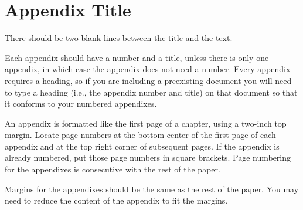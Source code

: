 \documentclass[letterpaper,12pt,oneside,openany]{book}
\begin{document}
\appendix

\chapter{Appendix Title}

There should be two blank lines between the title and the text.

Each appendix should have a number and a title, unless there is only one
appendix, in which case the appendix does not need a number. Every appendix
requires a heading, so if you are including a preexisting document you will
need to type a heading (i.e., the appendix number and title) on that document
so that it conforms to your numbered appendixes.

An appendix is formatted like the first page of a chapter, using a two-inch
top margin. Locate page numbers at the bottom center of the first page of each
appendix and at the top right corner of subsequent pages. If the appendix is
already numbered, put those page numbers in square brackets. Page numbering
for the appendixes is consecutive with the rest of the paper.

Margins for the appendixes should be the same as the rest of the paper. You
may need to reduce the content of the appendix to fit the margins.

\backmatter

\printbibliography[heading=bibintoc]
\end{document}

